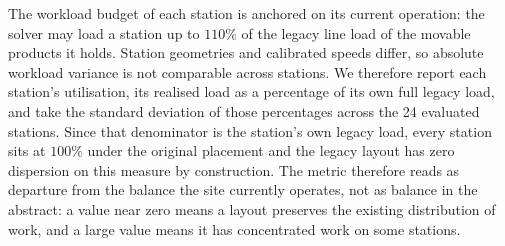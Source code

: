 \documentclass[]{interact}
\begin{document}
The workload budget of each station is anchored on its current operation: the solver may load a station up to $110\%$ of the legacy line load of the movable products it holds. Station geometries and calibrated speeds differ, so absolute workload variance is not comparable across stations. We therefore report each station's utilisation, its realised load as a percentage of its own full legacy load, and take the standard deviation of those percentages across the 24 evaluated stations. Since that denominator is the station's own legacy load, every station sits at $100\%$ under the original placement and the legacy layout has zero dispersion on this measure by construction. The metric therefore reads as departure from the balance the site currently operates, not as balance in the abstract: a value near zero means a layout preserves the existing distribution of work, and a large value means it has concentrated work on some stations.
\end{document}
